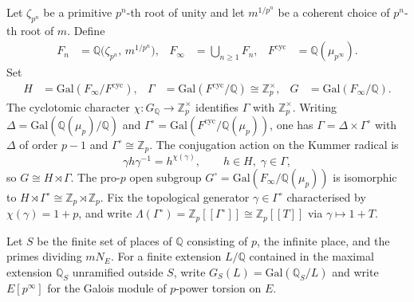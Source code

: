 \documentclass[11pt]{article}
\theoremstyle{definition}
\theoremstyle{remark}
\newcommand{\Z}{\mathbb{Z}}
\newcommand{\Q}{\mathbb{Q}}
\newcommand{\Gal}{\mathrm{Gal}}
\newcommand{\cyc}{\mathrm{cyc}}
\newcommand{\Lam}{\Lambda}
\newcommand{\Gp}{G^{\circ}}
\newcommand{\Gam}{\Gamma^{\circ}}
\begin{document}
Let \(\zeta_{p^n}\) be a primitive \(p^n\)-th root of unity and let \(m^{1/p^n}\) be a coherent choice of \(p^n\)-th root of \(m\). Define
\begin{align*}
F_n &= \Q\bigl(\zeta_{p^n},\, m^{1/p^n}\bigr),&
F_\infty &= \bigcup_{n\ge 1} F_n, &
F^{\cyc} &= \Q(\mu_{p^\infty}).
\end{align*}
Set
\begin{align*}
H &= \Gal(F_\infty/F^{\cyc}),&
\Gamma &= \Gal(F^{\cyc}/\Q)\cong\Z_p^\times,&
G &= \Gal(F_\infty/\Q).
\end{align*}
The cyclotomic character \(\chi:G_\Q\to\Z_p^\times\) identifies \(\Gamma\) with \(\Z_p^\times\). Writing \(\Delta=\Gal(\Q(\mu_p)/\Q)\) and \(\Gam=\Gal(F^{\cyc}/\Q(\mu_p))\), one has \(\Gamma=\Delta\times\Gam\) with \(\Delta\) of order \(p-1\) and \(\Gam\cong\Z_p\). The conjugation action on the Kummer radical is
\begin{equation}
\label{eq:semidirect}
\gamma h\gamma^{-1} = h^{\chi(\gamma)},\qquad h\in H,\;\gamma\in\Gamma,
\end{equation}
so \(G\cong H\rtimes\Gamma\). The pro-\(p\) open subgroup \(\Gp=\Gal(F_\infty/\Q(\mu_p))\) is isomorphic to \(H\rtimes\Gam\cong\Z_p\rtimes\Z_p\). Fix the topological generator \(\gamma\in\Gam\) characterised by \(\chi(\gamma)=1+p\), and write \(\Lam(\Gam)=\Z_p[[\Gam]]\cong\Z_p[[T]]\) via \(\gamma\mapsto 1+T\).

Let \(S\) be the finite set of places of \(\Q\) consisting of \(p\), the infinite place, and the primes dividing \(mN_E\). For a finite extension \(L/\Q\) contained in the maximal extension \(\Q_S\) unramified outside \(S\), write \(G_S(L)=\Gal(\Q_S/L)\) and write \(E[p^\infty]\) for the Galois module of \(p\)-power torsion on \(E\).
\end{document}
